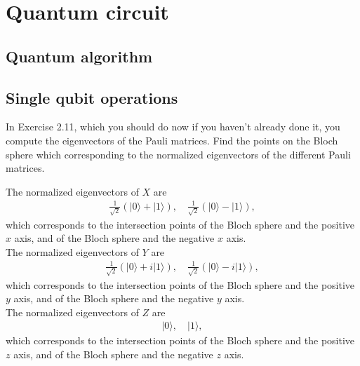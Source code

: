 \documentclass[en]{sol-man}
\begin{document}
\fi
\chapter{Quantum circuit}

\section{Quantum algorithm}

\section{Single qubit operations}

\begin{exe}
    In Exercise 2.11, which you should do now if you haven't already done it, you compute the eigenvectors of the Pauli matrices. Find the points on the Bloch sphere which corresponding to the normalized eigenvectors of the different Pauli matrices.
\end{exe}
\begin{sol}
    The normalized eigenvectors of $X$ are
    \begin{align}
        \frac{1}{\sqrt{2}}(\lvert 0\rangle+\lvert 1\rangle),\quad\frac{1}{\sqrt{2}}(\lvert 0\rangle-\lvert 1\rangle),
    \end{align}
    which corresponds to the intersection points of the Bloch sphere and the positive $x$ axis, and of the Bloch sphere and the negative $x$ axis.\\
    The normalized eigenvectors of $Y$ are
    \begin{align}
        \frac{1}{\sqrt{2}}(\lvert 0\rangle+i\lvert 1\rangle),\quad\frac{1}{\sqrt{2}}(\lvert 0\rangle-i\lvert 1\rangle),
    \end{align}
    which corresponds to the intersection points of the Bloch sphere and the positive $y$ axis, and of the Bloch sphere and the negative $y$ axis.\\
    The normalized eigenvectors of $Z$ are
    \begin{align}
        \lvert 0\rangle,\quad\lvert 1\rangle,
    \end{align}
    which corresponds to the intersection points of the Bloch sphere and the positive $z$ axis, and of the Bloch sphere and the negative $z$ axis.
\end{sol}
\end{document}
